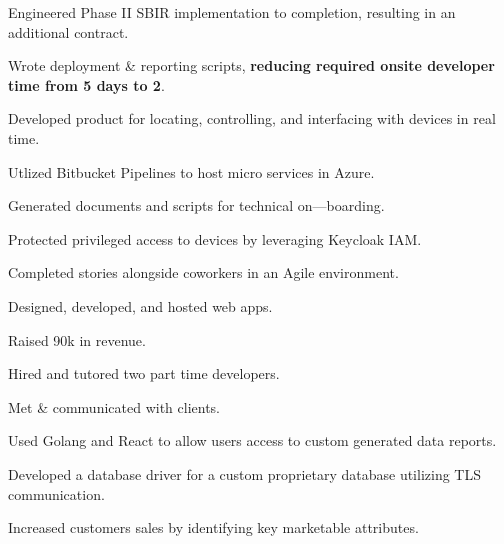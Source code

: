 \documentclass[]{resume-class}
\begin{document}
\begin{minipage}[t]{0.60\textwidth}
\begin{tightemize}
  \item{Engineered Phase II SBIR implementation to completion, resulting in an additional contract.}
  \item{Wrote deployment \& reporting scripts, \textbf{reducing required onsite developer time from 5 days to 2}.}
  \item{Developed product for locating, controlling, and interfacing with devices in real time.}
  \item{Utlized Bitbucket Pipelines to host micro services in Azure.}
  \item{Generated documents and scripts for technical on—boarding.}
  \item{Protected privileged access to devices by leveraging Keycloak IAM.}
  \item{Completed stories alongside coworkers in an Agile environment.}
\end{tightemize}
\sectionsep

\begin{tightemize}
  \item{Designed, developed, and hosted web apps.}
  \item{Raised 90k in revenue.}
  \item{Hired and tutored two part time developers.}
  \item{Met \& communicated with clients.}
\end{tightemize}
\sectionsep

\begin{tightemize}
\item{Used Golang and React to allow users access to custom generated data reports.}
\item{Developed a database driver for a custom proprietary database utilizing TLS communication.}
\item{Increased customers sales by identifying key marketable attributes.}
\end{tightemize}
\sectionsep

\end{minipage}
\hfill
\end{document}
